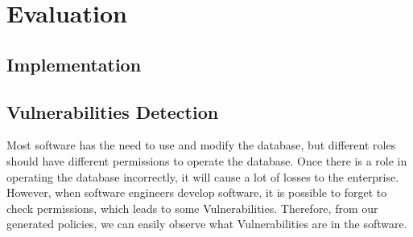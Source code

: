 \section{Evaluation}%





\subsection{Implementation}

\subsection{Vulnerabilities Detection}
Most software has the need to use and modify the database, but different roles should have different permissions to operate the database. Once there is a role in operating the database incorrectly, it will cause a lot of losses to the enterprise. However, when software engineers develop software, it is possible to forget to check permissions, which leads to some Vulnerabilities. Therefore, from our generated policies, we can easily observe what Vulnerabilities are in the software.


